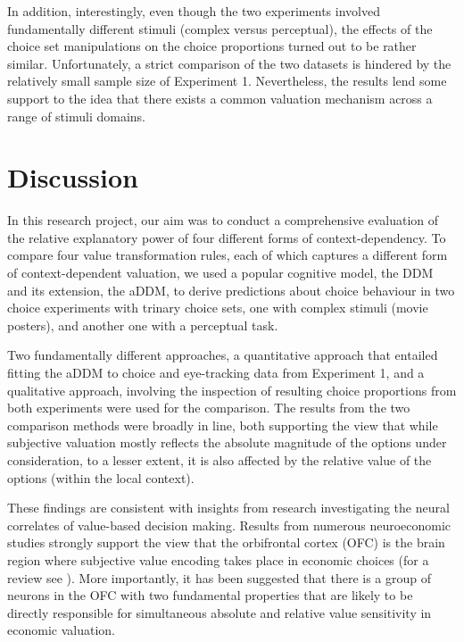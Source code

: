 \documentclass[11pt,a4paper]{article}
\begin{document}
In addition, interestingly, even though the two experiments involved fundamentally different stimuli (complex versus perceptual), the effects of the choice set manipulations on the choice proportions turned out to be rather similar. Unfortunately, a strict comparison of the two datasets is hindered by the relatively small sample size of Experiment 1. Nevertheless, the results lend some support to the idea that there exists a common valuation mechanism across a range of stimuli domains.



\newpage

\section{Discussion}

In this research project, our aim was to conduct a comprehensive evaluation of the relative explanatory power of four different forms of context-dependency. To compare four value transformation rules, each of which captures a different form of context-dependent valuation, we used a popular cognitive model, the DDM and its extension, the aDDM, to derive predictions about choice behaviour in two choice experiments with trinary choice sets, one with complex stimuli (movie posters), and another one with a perceptual task.

Two fundamentally different approaches, a quantitative approach that entailed fitting the aDDM to choice and eye-tracking data from Experiment 1, and a qualitative approach, involving the inspection of resulting choice proportions from both experiments were used for the comparison. The results from the two comparison methods were broadly in line, both supporting the view that while subjective valuation mostly reflects the absolute magnitude of the options under consideration, to a lesser extent, it is also affected by the relative value of the options (within the local context).

These findings are consistent with insights from research investigating the neural correlates of value-based decision making. Results from numerous neuroeconomic studies strongly support the view that the orbifrontal cortex (OFC) is the brain region where subjective value encoding takes place in economic choices (for a review see ). More importantly, it has been suggested that there is a group of neurons in the OFC with two fundamental properties that are likely to be directly responsible for simultaneous absolute and relative value sensitivity in economic valuation.
\end{document}
